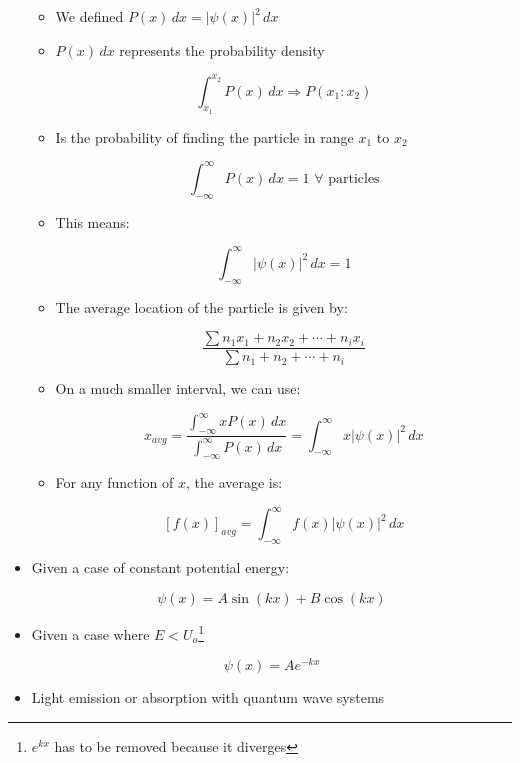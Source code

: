 \begin{itemize}
    \begin{itemize}

      \item We defined $P(x)\,dx=|\psi(x)|^2\,dx$

      \item $P(x)\,dx$ represents the probability density


        $$\int_{x_1}^{x_2} P(x)\,dx\Rightarrow P(x_1:x_2)$$

      \item Is the probability of finding the particle in range $x_1$ to $x_2$

        $$\int_{-\infty}^{\infty}P(x)\,dx=1\,\,\forall\text{ particles}$$

      \item This means:

        $$\boxed{\int_{-\infty}^{\infty} |\psi(x)|^2\,dx = 1}$$

      \item The average location of the particle is given by:

        $$\boxed{\dfrac{\sum n_1x_1+n_2x_2+\cdots+n_ix_i}{\sum n_1+n_2+\cdots+n_i}}$$

      \item On a much smaller interval, we can use:

        $$x_{avg}=\dfrac{\displaystyle \int_{-\infty}^{\infty} xP(x)\,dx}{\displaystyle \int_{-\infty}^{\infty} P(x)\,dx}=\int_{-\infty}^{\infty} x|\psi(x)|^2\,dx$$

      \item For any function of $x$, the average is:

        $$[f(x)]_{avg}=\int_{-\infty}^{\infty}f(x)|\psi(x)|^2\,dx$$

    \end{itemize}

  \item Given a case of constant potential energy:

    $$\psi(x)=A\sin(kx)+B\cos(kx)$$

  \item Given a case where $E < U_o$\footnote{$e^{kx}$ has to be removed because it diverges}

    $$\psi(x)=Ae^{-kx}$$

  \item Light emission or absorption with quantum wave systems

    \begin{itemize}


\end{itemize}
\end{itemize}
